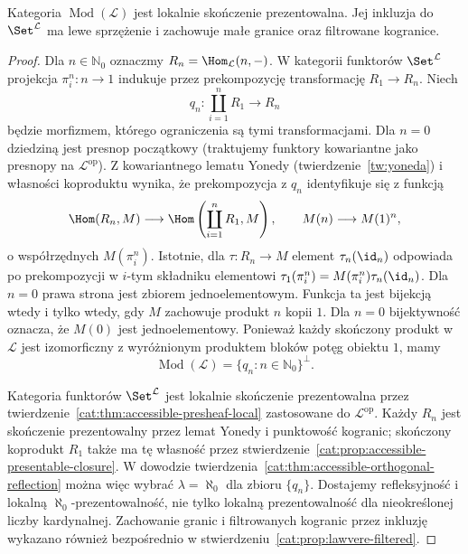 \begin{twierdzenie}\label{cat:thm:lawvere-lfp}
Kategoria $\operatorname{Mod}(\mathcal L)$ jest lokalnie skończenie prezentowalna. Jej inkluzja do $\Set^{\mathcal L}$ ma lewe sprzężenie i zachowuje małe granice oraz filtrowane kogranice.
\end{twierdzenie}
\begin{proof}
Dla $n\in\mathbb N_0$ oznaczmy $R_n=\Hom_{\mathcal L}(n,-)$. W kategorii funktorów $\Set^{\mathcal L}$ projekcja $\pi_i^n:n\to1$ indukuje przez prekompozycję transformację $R_1\to R_n$. Niech
\[
 q_n:\coprod_{i=1}^{n}R_1\longrightarrow R_n
\]
będzie morfizmem, którego ograniczenia są tymi transformacjami. Dla $n=0$ dziedziną jest presnop początkowy (traktujemy funktory kowariantne jako presnopy na $\mathcal L^{\mathrm{op}}$). Z kowariantnego lematu Yonedy (twierdzenie~\ref{tw:yoneda}) i własności koproduktu wynika, że prekompozycja z $q_n$ identyfikuje się z funkcją
\[
 \Hom(R_n,M)\longrightarrow\Hom\left(\coprod_{i=1}^nR_1,M\right),
 \qquad M(n)\longrightarrow M(1)^n,
\]
o współrzędnych $M(\pi_i^n)$. Istotnie, dla $\tau:R_n\to M$ element $\tau_n(\id_n)$ odpowiada po prekompozycji w $i$-tym składniku elementowi $\tau_1(\pi_i^n)=M(\pi_i^n)\tau_n(\id_n)$. Dla $n=0$ prawa strona jest zbiorem jednoelementowym. Funkcja ta jest bijekcją wtedy i tylko wtedy, gdy $M$ zachowuje produkt $n$ kopii $1$. Dla $n=0$ bijektywność oznacza, że $M(0)$ jest jednoelementowy. Ponieważ każdy skończony produkt w $\mathcal L$ jest izomorficzny z wyróżnionym produktem bloków potęg obiektu $1$, mamy
\[
 \operatorname{Mod}(\mathcal L)=\{q_n:n\in\mathbb N_0\}^{\perp}.
\]

Kategoria funktorów $\Set^{\mathcal L}$ jest lokalnie skończenie prezentowalna przez twierdzenie~\ref{cat:thm:accessible-presheaf-local} zastosowane do $\mathcal L^{\mathrm{op}}$. Każdy $R_n$ jest skończenie prezentowalny przez lemat Yonedy i punktowość kogranic; skończony koprodukt $R_1$ także ma tę własność przez stwierdzenie~\ref{cat:prop:accessible-presentable-closure}. W dowodzie twierdzenia~\ref{cat:thm:accessible-orthogonal-reflection} można więc wybrać $\lambda=\aleph_0$ dla zbioru $\{q_n\}$. Dostajemy refleksyjność i lokalną $\aleph_0$-prezentowalność, nie tylko lokalną prezentowalność dla nieokreślonej liczby kardynalnej. Zachowanie granic i filtrowanych kogranic przez inkluzję wykazano również bezpośrednio w stwierdzeniu~\ref{cat:prop:lawvere-filtered}.
\end{proof}

